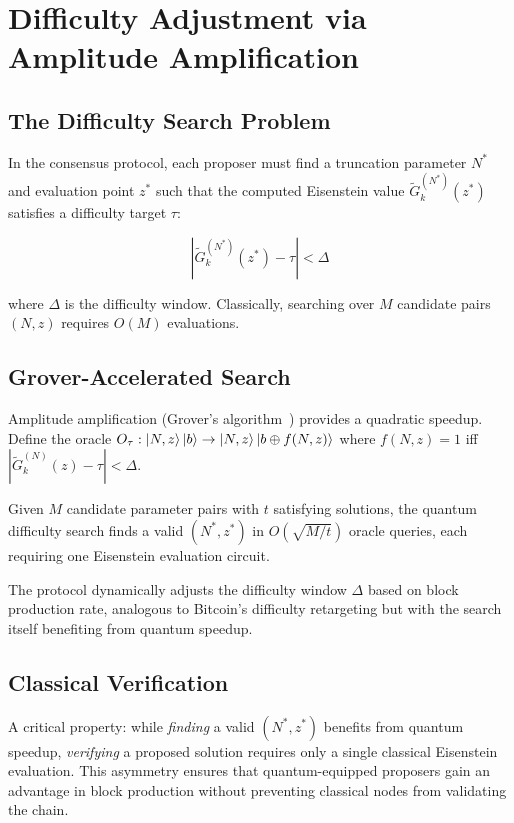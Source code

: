\section{Difficulty Adjustment via Amplitude Amplification}


\subsection{The Difficulty Search Problem}

In the consensus protocol, each proposer must find a truncation
parameter $N^*$ and evaluation point $z^*$ such that the computed
Eisenstein value $\tilde{G}_k^{(N^*)}(z^*)$ satisfies a difficulty
target $\tau$:

\[
\left| \tilde{G}_k^{(N^*)}(z^*) - \tau \right| < \Delta
\]

where $\Delta$ is the difficulty window. Classically, searching over
$M$ candidate pairs $(N, z)$ requires $O(M)$ evaluations.

\subsection{Grover-Accelerated Search}

Amplitude amplification (Grover's algorithm~\cite{grover1996})
provides a quadratic speedup. Define the oracle
$O_\tau: \ket{N,z}\ket{b} \rightarrow \ket{N,z}\ket{b \oplus f(N,z)}$
where $f(N,z) = 1$ iff $|\tilde{G}_k^{(N)}(z) - \tau| < \Delta$.

\begin{proposition}
Given $M$ candidate parameter pairs with $t$ satisfying solutions,
the quantum difficulty search finds a valid $(N^*, z^*)$ in
$O(\sqrt{M/t})$ oracle queries, each requiring one Eisenstein
evaluation circuit.
\end{proposition}

The protocol dynamically adjusts the difficulty window $\Delta$ based
on block production rate, analogous to Bitcoin's difficulty retargeting
but with the search itself benefiting from quantum speedup.

\subsection{Classical Verification}

A critical property: while \emph{finding} a valid $(N^*, z^*)$ benefits
from quantum speedup, \emph{verifying} a proposed solution requires only
a single classical Eisenstein evaluation. This asymmetry ensures that
quantum-equipped proposers gain an advantage in block production without
preventing classical nodes from validating the chain.

